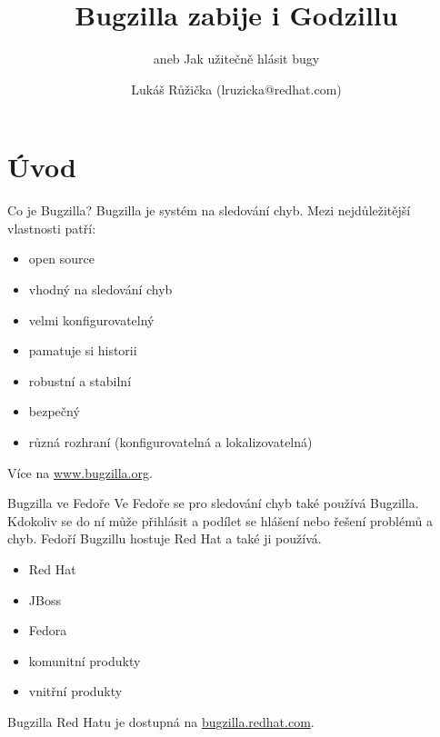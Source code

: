 \documentclass[12pt,aspectratio=169]{beamer}
\begin{document}
	\author{Lukáš Růžička (lruzicka@redhat.com)}
	\title{Bugzilla zabije i Godzillu}
	\subtitle{aneb Jak užitečně hlásit bugy}
	\date{}

\begin{frame}[plain]
	\maketitle 
\end{frame}

\section{Úvod}

\begin{frame}{Co je Bugzilla?}
Bugzilla je systém na sledování chyb. Mezi nejdůležitější vlastnosti patří:

\begin{itemize}
\item open source
\item vhodný na sledování chyb
\item velmi konfigurovatelný
\item pamatuje si historii
\item robustní a stabilní
\item bezpečný
\item různá rozhraní (konfigurovatelná a lokalizovatelná)
\end{itemize}

Více na {\color{blue}\url{www.bugzilla.org}}.
\end{frame}

\begin{frame}{Bugzilla ve Fedoře}
Ve Fedoře se pro sledování chyb také používá Bugzilla. Kdokoliv se do ní může přihlásit a podílet se hlášení nebo řešení problémů a chyb. Fedoří Bugzillu hostuje Red Hat a také ji používá.

\begin{itemize}
	\item Red Hat
	\item JBoss
	\item Fedora
	\item komunitní produkty
	\item vnitřní produkty
\end{itemize}

Bugzilla Red Hatu je dostupná na {\color{red}\url{bugzilla.redhat.com}}.
\end{frame}
\end{document}

